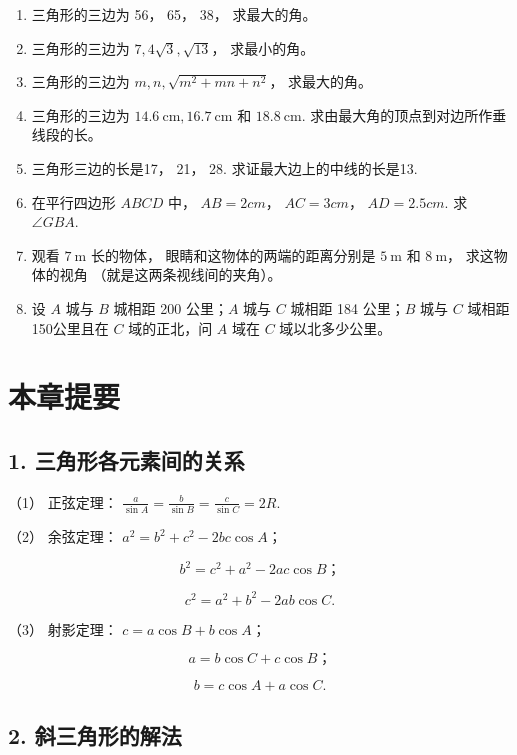 \begin{enumerate}[start=2]
\item
  三角形的三边为 56， 65， 38， 求最大的角。
\item
  三角形的三边为 \(7, 4\sqrt{3}, \sqrt{13}\)， 求最小的角。
\item
  三角形的三边为 \(m, n, \sqrt{m^2 + mn + n^2}\)， 求最大的角。
\item
  三角形的三边为 \(14.6 \mathrm{~cm}, 16.7 \mathrm{~cm}\) 和
  \(18.8 \mathrm{~cm}\). 求由最大角的顶点到对边所作垂线段的长。
\item
  三角形三边的长是17， 21， 28. 求证最大边上的中线的长是13.
\item
  在平行四边形 \(ABCD\) 中， \(AB = 2cm\)， \(AC = 3cm\)，
  \(AD = 2.5cm\). 求 \(\angle GBA\).
\item
  观看 \(7 \mathrm{~m}\) 长的物体， 眼睛和这物体的两端的距离分别是
  \(5 \mathrm{~m}\) 和 \(8 \mathrm{~m}\)， 求这物体的视角
  （就是这两条视线间的夹角）。
\item
  设 \(A\) 城与 \(B\) 城相距 200 公里；\(A\) 城与 \(C\) 城相距 184
  公里；\(B\) 城与 \(C\) 域相距150公里且在 \(C\) 域的正北，问 \(A\) 域在
  \(C\) 域以北多少公里。
\end{enumerate}

\section{本章提要}

\subsection{1. 三角形各元素间的关系}

（1） 正弦定理：
\(\frac{a}{\sin A} = \frac{b}{\sin B} = \frac{c}{\sin C} = 2R.\)

（2） 余弦定理： \(a^2 = b^2 + c^2 - 2bc\cos A\)；

\[
b ^ {2} = c ^ {2} + a ^ {2} - 2 a c \cos B\text{；}
\]

\[
c ^ {2} = a ^ {2} + b ^ {2} - 2 a b \cos C.
\]

（3） 射影定理： \(c = a \cos B + b \cos A\)；

\[
a = b \cos C + c \cos B\text{；}
\]

\[
b = c \cos A + a \cos C.
\]

\subsection{2. 斜三角形的解法}

